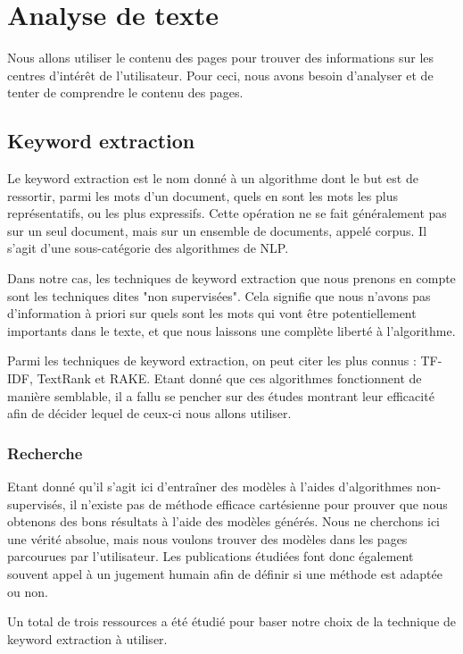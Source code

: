 \section{Analyse de texte}

	Nous allons utiliser le contenu des pages pour trouver des informations sur les centres d'intérêt de l'utilisateur. Pour ceci, nous avons besoin d'analyser et de tenter de comprendre le contenu des pages.

	\subsection{Keyword extraction}

		Le keyword extraction est le nom donné à un algorithme dont le but est de ressortir, parmi les mots d'un document, quels en sont les mots les plus représentatifs, ou les plus expressifs. Cette opération ne se fait généralement pas sur un seul document, mais sur un ensemble de documents, appelé corpus. Il s'agit d'une sous-catégorie des algorithmes de \gls{NLP}.

		Dans notre cas, les techniques de keyword extraction que nous prenons en compte sont les techniques dites "non supervisées". Cela signifie que nous n'avons pas d'information à priori sur quels sont les mots qui vont être potentiellement importants dans le texte, et que nous laissons une complète liberté à l'algorithme.

		Parmi les techniques de keyword extraction, on peut citer les plus connus : \gls{TF-IDF}, TextRank et \gls{RAKE}. Etant donné que ces algorithmes fonctionnent de manière semblable, il a fallu se pencher sur des études montrant leur efficacité afin de décider lequel de ceux-ci nous allons utiliser.

		\subsubsection{Recherche}

			Etant donné qu'il s'agit ici d'entraîner des modèles à l'aides d'algorithmes non-supervisés, il n'existe pas de méthode efficace cartésienne pour prouver que nous obtenons des bons résultats à l'aide des modèles générés. Nous ne cherchons ici une vérité absolue, mais nous voulons trouver des modèles dans les pages parcourues par l'utilisateur. Les publications étudiées font donc également souvent appel à un jugement humain afin de définir si une méthode est adaptée ou non.

			Un total de trois ressources a été étudié pour baser notre choix de la technique de keyword extraction à utiliser.

